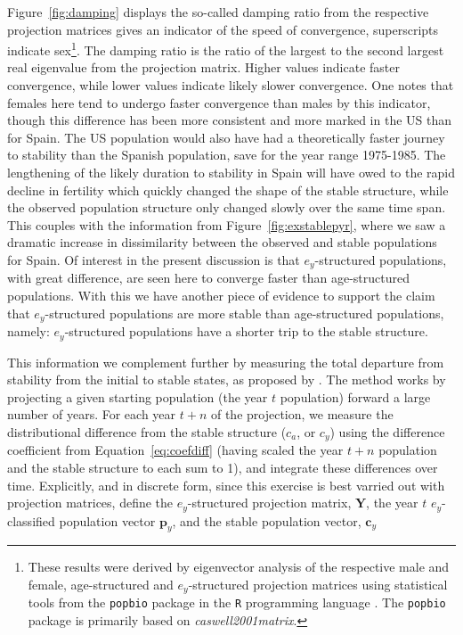 Figure~\ref{fig:damping} displays the so-called damping ratio from the
respective projection matrices gives an indicator of the speed of convergence,
superscripts indicate sex\footnote{These results were derived by eigenvector
analysis of the respective male and female, age-structured and
$e_y$-structured projection matrices using statistical tools from the
\texttt{popbio} package \citep{popbio2007} in the
\texttt{R} programming language \citep{Rcitation}. The \texttt{popbio} package
is primarily based on \textit{caswell2001matrix}.}. The damping ratio is the 
ratio of the largest to the second largest real eigenvalue from the projection 
matrix\citep[p. 101]{caswell2001matrix}. Higher values indicate faster 
convergence, while lower values indicate likely slower convergence. One notes 
that females here tend to undergo faster convergence than
males by this indicator, though this difference has been more consistent and
more marked in the US than for Spain. The US population would also have had a
theoretically faster journey to stability than the Spanish population, save for
the year range 1975-1985. The lengthening of the likely duration to stability in
Spain will have owed to the rapid decline in fertility which quickly changed the
shape of the stable structure, while the observed population structure only
changed slowly over the same time span. This couples with the information from
Figure~\ref{fig:exstablepyr}, where we saw a dramatic increase in
dissimilarity between the observed and stable populations for Spain. Of interest
in the present discussion is that $e_y$-structured populations, with great difference, 
are seen here to converge faster than age-structured populations. With this we 
have another piece of evidence to support the claim that $e_y$-structured populations are more stable than
age-structured populations, namely: $e_y$-structured populations have a shorter
trip to the stable structure.

This information we complement further by measuring the total departure from
stability from the initial to stable states, as proposed by
\citet{cohen1979cumulative}. The method works by projecting a given starting
population (the year $t$ population) forward a large number of years. For each
year $t+n$ of the projection, we measure the distributional difference from
the stable structure ($c_a$, or $c_y$) using the difference coefficient from
Equation~\ref{eq:coefdiff} (having scaled the year $t+n$ population and the
stable structure to each sum to 1), and integrate these differences over time.
Explicitly, and in discrete form, since this exercise is best varried out with
projection matrices, define the $e_y$-structured projection matrix,
$\textbf{Y}$, the year $t$ $e_y$-classified population vector
$\textbf{p}_y$, and the stable population vector, $\textbf{c}_y$

